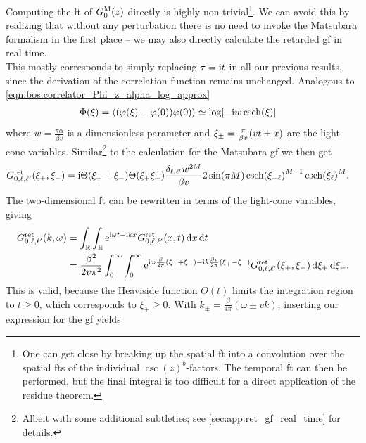 Computing the \gls{ft} of $G_0^{\text{M}}(z)$ directly is highly non-trivial\footnote{One can get close by breaking up the spatial \gls{ft} into a convolution over the spatial \glspl{ft} of the individual $\csc(z)^b$-factors. The temporal \gls{ft} can then be performed, but the final integral is too difficult for a direct application of the residue theorem.}.
We can avoid this by realizing that without any perturbation there is no need to invoke the Matsubara formalism in the first place -- we may also directly calculate the retarded \gls{gf} in real time.\\
This mostly corresponds to simply replacing $\tau = \text{i} t$ in all our previous results, since the derivation of the correlation function remains unchanged.
Analogous to \autoref{eqn:bos:correlator_Phi_z_alpha_log_approx}
\begin{align}
\Phi(\xi) &= \bra*{\kla*{\varphi(\xi) - \varphi(0)}\varphi(0)} \simeq \log\klb*{-\i w \csch(\xi)} \label{eqn:ell:gf:correlator_Phi_xi_alpha_log_approx}
\end{align}
where $w=\frac{\pi\alpha}{\beta v}$ is a dimensionless parameter and $\xi_\pm = \frac{\pi}{\beta v} \kla*{vt \pm x}$ are the light-cone variables.
Similar\footnote{Albeit with some additional subtleties; see \autoref{sec:app:ret_gf_real_time} for details.} to the calculation for the Matsubara \gls{gf} we then get
\begin{align*}
G^\ret_{0,\ell,\ell'}(\xi_+, \xi_-) &= \i\Theta(\xi_+ + \xi_-) \Theta(\xi_+\xi_-) \frac{\delta_{\ell,\ell'} w^{2M}}{\beta v} 2\sin(\pi M) \csch(\xi_{-\ell})^{M+1} \csch(\xi_{\ell})^M.
\end{align*}%
The two-dimensional \gls{ft} can be rewritten in terms of the light-cone variables, giving
\begin{align*}
G^{\text{ret}}_{0,\ell,\ell'}(k,\omega) &= \int_{\mathbb{R}}  \int_{\mathbb{R}} \text{e}^{\text{i} \omega t - \text{i} kx} G^{\text{ret}}_{0,\ell,\ell'}(x,t) \, \mathrm{d}x  \, \mathrm{d}t \\
&= \frac{\beta^2}{2v\pi^2} \int_{0}^{\infty} \int_{0}^{\infty}  \text{e}^{\text{i}\omega \frac{\beta}{2\pi} (\xi_+ + \xi_-) - \text{i} k \frac{\beta v}{2\pi} (\xi_+ - \xi_-)} G^{\text{ret}}_{0,\ell,\ell'}(\xi_+, \xi_-)  \,\mathrm{d}\xi_+ \,\mathrm{d}\xi_-.
\end{align*}
This is valid, because the Heaviside function $\Theta(t)$ limits the integration region to $t\ge 0$, which corresponds to $\xi_\pm \ge 0$.
With $k_\pm = \frac{\beta}{4\pi} (\omega \pm vk)$, inserting our expression for the \gls{gf} yields
